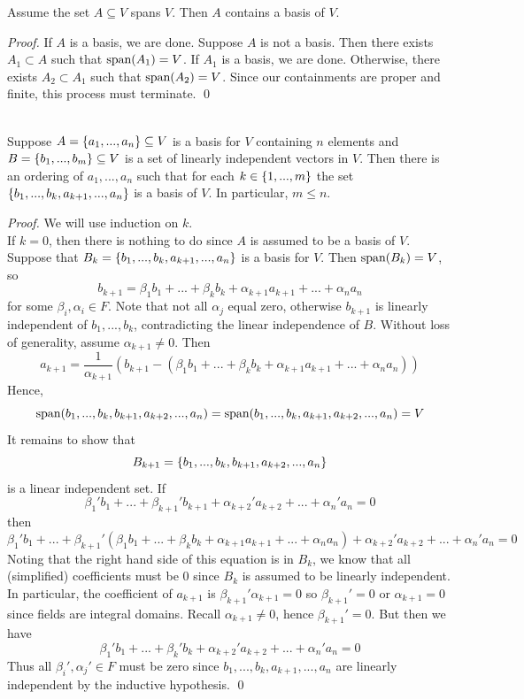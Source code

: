 \begin{corollary}
    Assume the set $A \subseteq V$ spans $V$. Then $A$ contains a basis of $V$.
\end{corollary}

\begin{proof}
    If $A$ is a basis, we are done. Suppose $A$ is not a basis. Then there exists $A_1 \subset A$ such that $\text{span}(A_1) = V$. If $A_1$ is a basis, we are done. Otherwise, there exists $A_2 \subset A_1$ such that $\text{span}(A_2) = V$. Since our containments are proper and finite, this process must terminate.
    \qed
\end{proof}

\begin{theorem} \leavevmode \\
    Suppose $A = \left\{a_1, ..., a_n\right\} \subseteq V$ is a basis for $V$ containing $n$ elements and $B = \left\{b_1, ..., b_m\right\}\subseteq V$ is a set of linearly independent vectors in $V$. Then there is an ordering of $a_1,..., a_n$ such that for each $k \in \left\{1, ..., m\right\}$ the set $\left\{b_1, ..., b_k, a_{k+1}, ..., a_n\right\}$ is a basis of $V$. In particular, $m \leq n$.
\end{theorem}

\begin{proof}
    We will use induction on $k$.\\
    If $k=0$, then there is nothing to do since $A$ is assumed to be a basis of $V$. Suppose that $B_k = \left\{b_1, ..., b_k, a_{k+1}, ..., a_n\right\}$ is a basis for $V$. Then $\text{span}(B_k) = V$, so
    $$b_{k+1} = \beta_1b_1 + ... + \beta_kb_k + \alpha_{k+1}a_{k+1}+...+\alpha_n a_n$$
    for some $\beta_i, \alpha_i \in F$. Note that not all $\alpha_j$ equal zero, otherwise $b_{k+1}$ is linearly independent of $b_1,...,b_k$, contradicting the linear independence of $B$. Without loss of generality, assume $\alpha_{k+1} \neq 0$. Then
    $$a_{k+1} = \dfrac{1}{\alpha_{k+1}}\left(b_{k+1}-(\beta_1b_1+...+\beta_kb_k+\alpha_{k+1}a_{k+1}+...+\alpha_na_n)\right)$$
    Hence,
    $$\text{span}(b_1,...,b_k,b_{k+1},a_{k+2},...,a_n)= \text{span}(b_1,...,b_k,a_{k+1},a_{k+2},...,a_n) = V$$
    It remains to show that
    $$B_{k+1} =\left\{b_1,...,b_k,b_{k+1},a_{k+2},...,a_n\right\}$$
    is a linear independent set.
    If
    $$\beta_1'b_1 + ... + \beta_{k+1}'b_{k+1} + \alpha_{k+2}'a_{k+2} +... + \alpha_n'a_n = 0$$
    then
    $$\beta_1'b_1 + ... + \beta_{k+1}'(\beta_1b_1 + ... + \beta_k b_k + \alpha_{k+1}a_{k+1} + ... + \alpha_n a_n) + \alpha_{k+2}'a_{k+2} + ... + \alpha_n'a_n = 0$$
    Noting that the right hand side of this equation is in $B_k$, we know that all (simplified) coefficients must be $0$ since $B_k$ is assumed to be linearly independent. In particular, the coefficient of $a_{k+1}$ is $\beta_{k+1}'\alpha_{k+1} = 0$ so $\beta_{k+1}' = 0$ or $\alpha_{k+1} = 0$ since fields are integral domains. Recall $\alpha_{k+1} \neq 0$, hence $\beta_{k+1}' = 0$. But then we have
    $$\beta_1'b_1 + ... + \beta_k'b_k + \alpha_{k+2}'a_{k+2} + ... + \alpha_n'a_n = 0$$
    Thus all $\beta_i', \alpha_j' \in F$ must be zero since $b_1, ..., b_k, a_{k+1}, ..., a_n$ are linearly independent by the inductive hypothesis.
    \qed
\end{proof}

